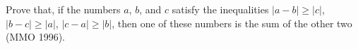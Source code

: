 Prove that, if the numbers $a$, $b$, and $c$ satisfy the inequalities $|a - b| \geq |c|$, $|b - c| \geq |a|$, $|c - a| \geq |b|$, then one of these numbers is the sum of the other two (MMO 1996).
